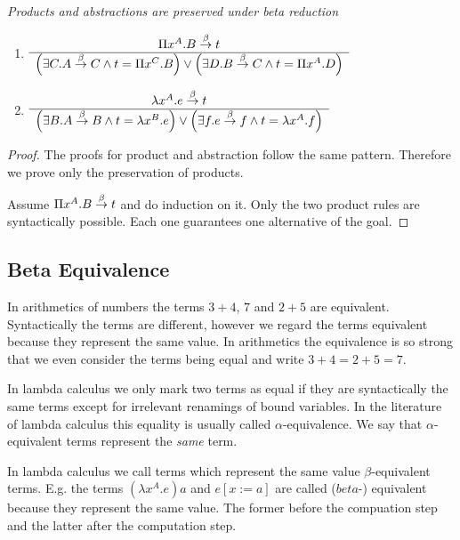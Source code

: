 \begin{lemma}
    \label{ReductionProductAbstraction}
    \emph{Products and abstractions are preserved under beta reduction}
    \begin{enumerate}
    \item
    $
        \begin{array}{c} 
            \Pi x^A.B \stackrel{\beta}{\to} t
         \\ \hline 
            \left( \exists C. A \stackrel{\beta}{\to} C \land t = \Pi x^C. B \right)
            \lor
            \left( \exists D. B \stackrel{\beta}{\to} C \land t = \Pi x^A. D \right)
        \end{array}
    $
    \item
    $
        \begin{array}{c} 
            \lambda x^A.e \stackrel{\beta}{\to} t
         \\ \hline 
            \left( \exists B. A \stackrel{\beta}{\to} B \land t = \lambda x^B. e \right)
            \lor
            \left( \exists f. e \stackrel{\beta}{\to} f \land t = \lambda x^A. f \right)
        \end{array}
    $
    \end{enumerate}

    \begin{proof}
        The proofs for product and abstraction follow the same pattern.
        Therefore we prove only the preservation of products.

        Assume $\Pi x^A. B \stackrel{\beta}{\to} t$ and do induction on it. Only the two
        product rules are syntactically possible. Each one guarantees one
        alternative of the goal.
    \end{proof}
\end{lemma}



\subsection{Beta Equivalence}

In arithmetics of numbers the terms $3 + 4$, $7$ and $2 + 5$ are equivalent.
Syntactically the terms are different, however we regard the terms equivalent
because they represent the same value. In arithmetics the equivalence is so
strong that we even consider the terms being equal and write $3 + 4 = 2 + 5 = 7$.

In lambda calculus we only mark two terms as equal if they are syntactically the
same terms except for irrelevant renamings of bound variables. In the literature
of lambda calculus this equality is usually called $\alpha$-equivalence. We say
that $\alpha$-equivalent terms represent the \emph{same} term.

In lambda calculus we call terms which represent the same value
$\beta$-equivalent terms. E.g. the terms $(\lambda x^A.e) a$ and $e[x:=a]$ are
called ($beta$-) equivalent because they represent the same value. The former
before the compuation step and the latter after the computation step.

